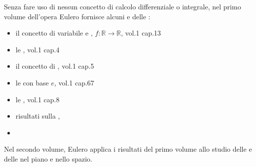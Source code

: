 \documentclass[letterpaper,10pt,italian]{jupyterBook}
\begin{document}
\sphinxAtStartPar
Senza fare uso di nessun concetto di calcolo differenziale o integrale, nel primo volume dell’opera Eulero fornisce alcuni  e delle :
\begin{itemize}
\item {} 
\sphinxAtStartPar
il concetto di variabile e {\hyperref[\detokenize{ch/precalculus/real-functions:math-hs-precalculus-real-functions}]{}}, \(f: \mathbb{R} \rightarrow \mathbb{R}\), vol.1 cap.1\sphinxhyphen{}3

\item {} 
\sphinxAtStartPar
le {\hyperref[\detokenize{ch/series:math-hs-series}]{}}, vol.1 cap.4

\item {} 
\sphinxAtStartPar
il concetto di {\hyperref[\detokenize{ch/precalculus/multivariable-real-fun:math-hs-precalculus-multivariable-real-fun}]{}}, vol.1 cap.5

\item {} 
\sphinxAtStartPar
le {\hyperref[\detokenize{ch/exponential_logarithm:math-hs-exp-log}]{}} con base \(e\), vol.1 cap.6\sphinxhyphen{}7

\item {} 
\sphinxAtStartPar
le {\hyperref[\detokenize{ch/trigonometry:math-hs-trigonometry}]{}}, vol.1 cap.8

\item {} 
\sphinxAtStartPar
risultati sulla {\hyperref[\detokenize{ch/precalculus/polynomials:math-hs-precalculus-polynomials}]{}}, 

\item {} 
\sphinxAtStartPar
{}  

\end{itemize}

\sphinxAtStartPar
Nel secondo volume, Eulero applica i risultati del primo volume allo studio delle  e delle  nel piano e nello spazio.
\end{document}
